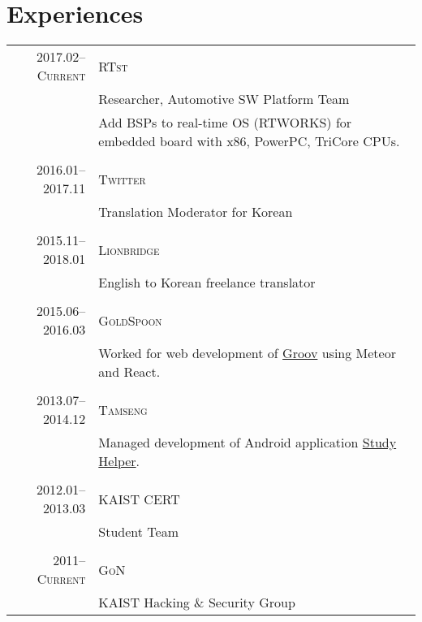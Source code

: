\documentclass[a4paper,10pt]{article}
\begin{document}
\section{Experiences}
\begin{tabular}{r|p{11cm}}
  \textsc{2017.02--Current} & \textsc{RTst} \\
                            & Researcher, Automotive SW Platform Team \\
                            & Add BSPs to real-time OS (RTWORKS) for embedded board with x86, PowerPC, TriCore CPUs. \\
  \multicolumn{2}{c}{} \\

  \textsc{2016.01--2017.11} & \textsc{Twitter} \\
                            & Translation Moderator for Korean \\
  \multicolumn{2}{c}{} \\

  \textsc{2015.11--2018.01} & \textsc{Lionbridge} \\
                            & English to Korean freelance translator \\
  \multicolumn{2}{c}{} \\

  \textsc{2015.06--2016.03} & \textsc{GoldSpoon} \\
                            & Worked for web development of \href{http://groov.fm}{Groov} using Meteor and React. \\
  \multicolumn{2}{c}{} \\

  \textsc{2013.07--2014.12} & \textsc{Tamseng} \\
                            & Managed development of Android application \href{https://play.google.com/store/apps/details?id=kr.co.tamseng.StudyHelper}{Study Helper}. \\
  \multicolumn{2}{c}{} \\

  \textsc{2012.01--2013.03} & \textsc{KAIST CERT} \\
                            & Student Team \\
  \multicolumn{2}{c}{} \\

  \textsc{2011--Current} & \textsc{GoN} \\
                         & KAIST Hacking \& Security Group \\
\end{tabular}
\end{document}
